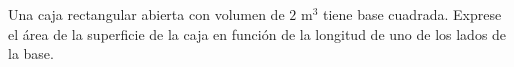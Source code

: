 \item Una caja rectangular abierta con volumen de $2\text{ m}^3$ tiene base cuadrada. Exprese el área de la superficie de la caja en función de la longitud de uno de los lados de la base.
